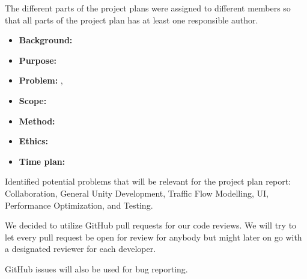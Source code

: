 The different parts of the project plans were assigned to different members so that all parts of the project plan has at least one responsible author.

\begin{itemize}
    \item \textbf{Background:} \martin
    \item \textbf{Purpose:} \jakob
    \item \textbf{Problem:} \hannes, \felix
    \item \textbf{Scope:} \jakob
    \item \textbf{Method:} \marcus
    \item \textbf{Ethics:} \arvid
    \item \textbf{Time plan:} \andtolist{\members}
\end{itemize}

Identified potential problems that will be relevant for the project plan report: Collaboration, General Unity Development, Traffic Flow Modelling, UI, Performance Optimization, and Testing.

We decided to utilize GitHub pull requests for our code reviews. We will try to let every pull request be open for review for anybody but might later on go with a designated reviewer for each developer. 

GitHub issues will also be used for bug reporting.



